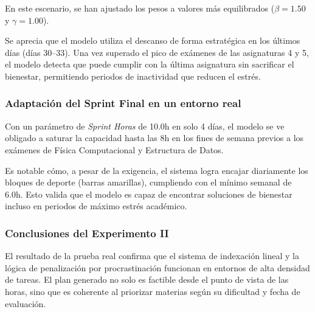 \documentclass{article}
\begin{document}
En este escenario, se han ajustado los pesos a valores más equilibrados ($\beta = 1.50$ y $\gamma = 1.00$).

Se aprecia que el modelo utiliza el descanso de forma estratégica en los últimos días (días 30--33). Una vez superado el pico de exámenes de las asignaturas 4 y 5, el modelo detecta que puede cumplir con la última asignatura sin sacrificar el bienestar, permitiendo periodos de inactividad que reducen el estrés.

\subsubsection{Adaptación del Sprint Final en un entorno real}

Con un parámetro de \textit{Sprint Horas} de 10.0h en solo 4 días, el modelo se ve obligado a saturar la capacidad hasta las 8h en los fines de semana previos a los exámenes de Física Computacional y Estructura de Datos.

Es notable cómo, a pesar de la exigencia, el sistema logra encajar diariamente los bloques de deporte (barras amarillas), cumpliendo con el mínimo semanal de 6.0h. Esto valida que el modelo es capaz de encontrar soluciones de bienestar incluso en periodos de máximo estrés académico.

\subsubsection{Conclusiones del Experimento II}

El resultado de la prueba real confirma que el sistema de indexación lineal y la lógica de penalización por procrastinación funcionan en entornos de alta densidad de tareas. El plan generado no solo es factible desde el punto de vista de las horas, sino que es coherente al priorizar materias según su dificultad y fecha de evaluación.
\end{document}
